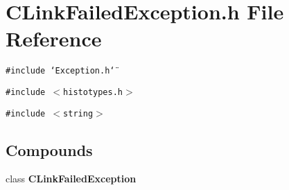 \section{CLink\-Failed\-Exception.h File Reference}
\label{CLinkFailedException_8h}
{\tt \#include \char`\"{}Exception.h\char`\"{}}\par
{\tt \#include $<$histotypes.h$>$}\par
{\tt \#include $<$string$>$}\par
\subsection*{Compounds}
\begin{CompactItemize}
\item 
class {\bf CLink\-Failed\-Exception}
\end{CompactItemize}
